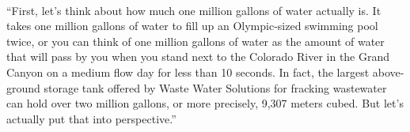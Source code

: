 \documentclass{article}
\begin{document}
\paragraph{}
``First, let’s think about how much one million gallons of water actually is. It takes one million gallons of water to fill up an Olympic-sized swimming pool twice, or you can think of one million gallons of water as the amount of water that will pass by you when you stand next to the Colorado River in the Grand Canyon on a medium flow day for less than 10 seconds. In fact, the largest above-ground storage tank offered by Waste Water Solutions for fracking wastewater can hold over two million gallons, or more precisely, 9,307 meters cubed. But let’s actually put that into perspective.”
\end{document}
